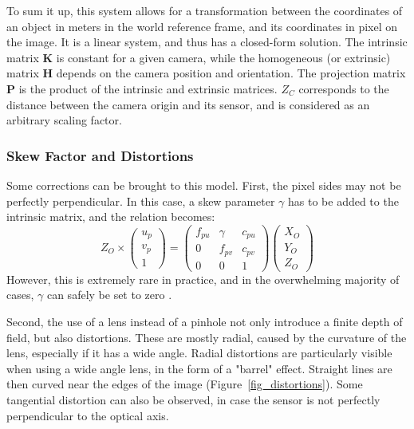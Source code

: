 To sum it up, this system allows for a transformation between the coordinates of an object in meters in the world reference frame, and its coordinates in pixel on the image. It is a linear system, and thus has a closed-form solution. The intrinsic matrix $\textbf{K}$ is constant for a given camera, while the homogeneous (or extrinsic) matrix $\textbf{H}$ depends on the camera position and orientation. The projection matrix $\textbf{P}$ is the product of the intrinsic and extrinsic matrices. $Z_C$ corresponds to the distance between the camera origin and its sensor, and is considered as an arbitrary scaling factor.


\subsubsection{Skew Factor and Distortions}

Some corrections can be brought to this model. First, the pixel sides may not be perfectly perpendicular. In this case, a skew parameter $\gamma$ has to be added to the intrinsic matrix, and the relation becomes:
\begin{equation}
  Z_O \times \begin{pmatrix}u_p\\v_p\\1\end{pmatrix} = \begin{pmatrix}f_{pu} & \gamma & c_{pu} \\ 0 & f_{pv} & c_{pv} \\ 0&0&1\end{pmatrix}\begin{pmatrix}X_O\\Y_O\\Z_O\end{pmatrix}
\end{equation}
However, this is extremely rare in practice, and in the overwhelming majority of cases, $\gamma$
can safely be set to zero \cite{Zhang2000}.

\vspace*{0.5cm}
Second, the use of a lens instead of a pinhole not only introduce a finite depth of field, but also distortions. These are mostly radial, caused by the curvature of the lens, especially if it has a wide angle. Radial distortions are particularly visible when using a wide angle lens, in the form of a "barrel" effect. Straight lines are then curved near the edges of the image (Figure~\ref{fig_distortions}). Some tangential distortion can also be observed, in case the sensor is not perfectly perpendicular to the optical axis. 

